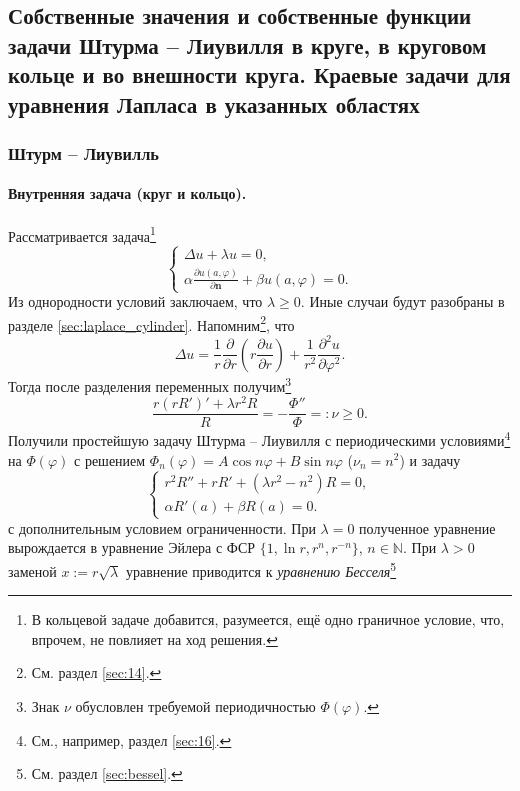 \subsection{Собственные значения и собственные функции задачи Штурма -- Лиувилля
	в круге, в круговом кольце и во внешности круга. Краевые задачи для уравнения
	Лапласа в указанных областях}\label{sec:20}
\subsubsection{Штурм -- Лиувилль}
\paragraph{Внутренняя задача (круг и кольцо).}
Рассматривается задача\footnote{В кольцевой задаче добавится, разумеется, ещё
	одно граничное условие, что, впрочем, не повлияет на ход решения.}
\[
\begin{cases}
	\Delta u + \lambda u = 0,\\
	\alpha \frac{\partial u(a, \varphi)}{\partial \mathbf n} + \beta u(a, \varphi) = 0.
\end{cases}
\]
Из однородности условий заключаем, что $ \lambda \geqslant 0 $. Иные случаи будут разобраны в разделе
\ref{sec:laplace_cylinder}. Напомним\footnote{См. раздел \ref{sec:14}.}, что  
\[
\Delta u = \frac{1}{r} \frac{\partial}{\partial r} \left( r \frac{\partial
	u}{\partial r} \right) + \frac{1}{r^2} \frac{\partial^2 u}{\partial
	\varphi^2}.
\]
Тогда после разделения переменных получим\footnote{Знак $ \nu $ обусловлен
	требуемой периодичностью $ \Phi(\varphi) $.}
\[
\frac{r (r R')' + \lambda r^2 R}{R} = - \frac{\Phi''}{\Phi} =: \nu \geqslant
0.
\]
Получили простейшую задачу Штурма -- Лиувилля с периодическими
условиями\footnote{См., например, раздел \ref{sec:16}.}
на $ \Phi(\varphi) $ с решением $ \Phi_n(\varphi) = A\cos n\varphi + B\sin
n\varphi $ ($ \nu_n = n^2 $) и задачу
\begin{equation}
	\label{eq:bessel_eq}
	\begin{cases}
		r^2R'' + rR' + (\lambda r^2 - n^2) R = 0,\\
		\alpha R'(a) + \beta R(a) = 0.
	\end{cases}
\end{equation}
с дополнительным условием ограниченности. При $ \lambda = 0 $ полученное
уравнение вырождается в уравнение Эйлера с ФСР $ \{1, \ln r , r^n, r^{-n}\}$, $n
\in \mathbb N$. При $ \lambda > 0 $ заменой $ x := r\sqrt\lambda $
уравнение
приводится к \emph{уравнению Бесселя}\footnote{См. раздел \ref{sec:bessel}.} 
